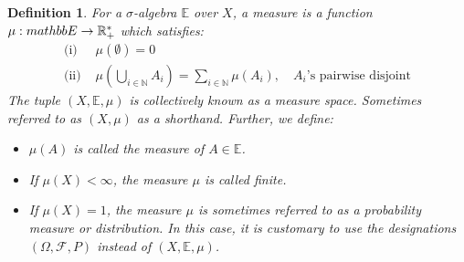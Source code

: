 \documentclass[12pt, a4paper]{article}
\newtheorem{definition}{Definition}[section]
\numberwithin{equation}{section}
\begin{document}
\begin{definition}
\label{measure_definition}
For a $\sigma$-algebra $\mathbb{E}$ over $X$, a measure is a function $\mu: \\mathbb{E}\rightarrow\mathbb{R}_+^*$ which satisfies:
\begin{align}
\textrm{(i) }&\mu(\emptyset)=0\\
\textrm{(ii) }&\mu\left(\bigcup_{i\in\mathbb{N}}A_i\right)=\sum_{i\in\mathbb{N}}\mu(A_i),\quad A_i\textrm{'s pairwise disjoint}
\end{align}
The tuple $(X, \mathbb{E}, \mu)$ is collectively known as a measure space. Sometimes referred to as $(X, \mu)$ as a shorthand. Further, we define:
\begin{itemize}
\item $\mu(A)$ is called the measure of $A\in\mathbb{E}$.
\item If $\mu(X)<\infty$, the measure $\mu$ is called finite.
\item If $\mu(X)=1$, the measure $\mu$ is sometimes referred to as a probability measure or distribution. In this case, it is customary to use the designations $(\Omega,\mathcal{F},P)$ instead of $(X, \mathbb{E}, \mu)$.
\end{itemize}
\end{definition}
\end{document}
